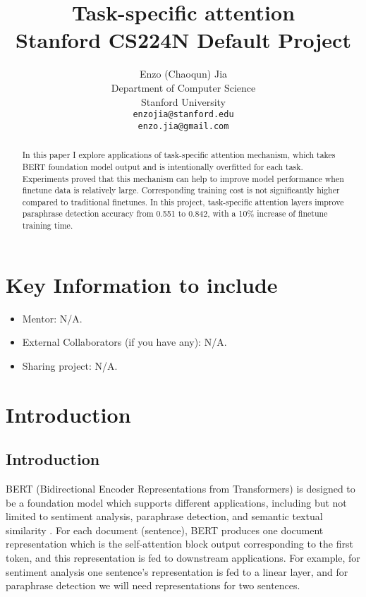 \documentclass{article}
\title{
  Task-specific attention \\
  \vspace{1em}
  \small{\normalfont Stanford CS224N Default Project}  %
}
\author{
  Enzo (Chaoqun) Jia \\
  Department of Computer Science \\
  Stanford University \\
  \texttt{enzojia@stanford.edu} \\
  \texttt{enzo.jia@gmail.com} \\
}
\begin{document}
\maketitle

\begin{abstract}
  In this paper I explore applications of task-specific attention mechanism, which takes BERT foundation model output and is intentionally overfitted for each task. Experiments proved that this mechanism can help to improve model performance when finetune data is relatively large. Corresponding training cost is not significantly higher compared to traditional finetunes. In this project, task-specific attention layers improve paraphrase detection accuracy from 0.551 to 0.842, with a 10\% increase of finetune training time.
\end{abstract}


\section{Key Information to include}
\begin{itemize}
    \item Mentor: N/A.
    \item External Collaborators (if you have any): N/A.
    \item Sharing project: N/A.
\end{itemize}

\section{Introduction}
\subsection{Introduction}
\label{intro}
BERT (Bidirectional Encoder Representations from Transformers) is designed to be a foundation model which supports different applications, including but not limited to sentiment analysis, paraphrase detection, and semantic textual similarity  \citet{devlin2019bert}. For each document (sentence), BERT produces one document representation which is the self-attention block output corresponding to the first token, and this representation is fed to downstream applications. For example, for sentiment analysis one sentence's representation is fed to a linear layer, and for paraphrase detection we will need representations for two sentences. 
\end{document}
